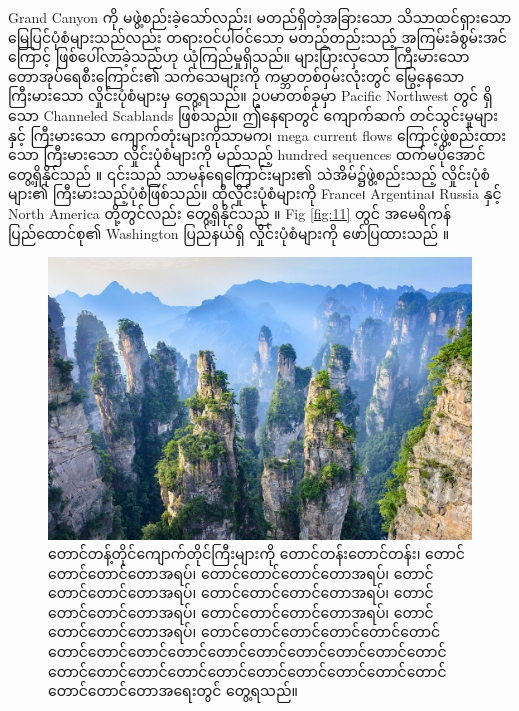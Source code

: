 \documentclass[10pt,twocolumn,letterpaper]{article}
\begin{document}
Grand Canyon ကို မဖွဲ့စည်းခဲ့သော်လည်း၊ မတည်ရှိတဲ့အခြားသော သိသာထင်ရှားသော မြေပြင်ပုံစံများသည်လည်း တရားဝင်ပါဝင်သော မတည့်တည်းသည့် အကြမ်းခံစွမ်းအင်ကြောင့် ဖြစ်ပေါ်လာခဲ့သည်ဟု ယုံကြည်မှုရှိသည်။ များပြားလှသော ကြီးမားသော တောအုပ်ရေစီးကြောင်း၏ သက်သေများကို ကမ္ဘာတစ်ဝှမ်းလုံးတွင် မြွေ့နေသော ကြီးမားသော လှိုင်းပုံစံများမှ တွေ့ရသည်။ ဥပမာတစ်ခုမှာ Pacific Northwest တွင် ရှိသော Channeled Scablands ဖြစ်သည်။ ဤနေရာတွင် ကျောက်ဆက် တင်သွင်းမှုများနှင့် ကြီးမားသော ကျောက်တုံးများကိုသာမက၊ mega current flows ကြောင့်ဖွဲ့စည်းထားသော ကြီးမားသော လှိုင်းပုံစံများကို မည်သည့် hundred sequences ထက်မပိုအောင် တွေ့ရှိနိုင်သည် \cite{78,79} ။ ၎င်းသည် သာမန်ရေကြောင်းများ၏ သဲအိမ်၌ဖွဲ့စည်းသည့် လှိုင်းပုံစံများ၏ ကြီးမားသည့်ပုံစံဖြစ်သည်။ ထိုလှိုင်းပုံစံများကို France၊ Argentina၊ Russia နှင့် North America တို့တွင်လည်း တွေ့ရှိနိုင်သည် \cite{81} ။ Fig \ref{fig:11} တွင် အမေရိကန်ပြည်ထောင်စု၏ Washington ပြည်နယ်ရှိ လှိုင်းပုံစံများကို ဖော်ပြထားသည် \cite{80}။

\begin{figure}[b]
\begin{center}
   \includegraphics[width=1\linewidth]{zhangjiajie.jpg}
\end{center}
   \caption{တောင်တန့်တိုင်ကျောက်တိုင်ကြီးများကို တောင်တန်းတောင်တန်း၊ တောင်တောင်တောင်တောအရပ်၊ တောင်တောင်တောင်တောအရပ်၊ တောင်တောင်တောင်တောအရပ်၊ တောင်တောင်တောင်တောအရပ်၊ တောင်တောင်တောင်တောအရပ်၊ တောင်တောင်တောင်တောအရပ်၊ တောင်တောင်တောင်တောအရပ်၊ တောင်တောင်တောင်တောင်တောင်တောင်တောင်တောင်တောင်တောင်တောင်တောင်တောင်တောင်တောင်တောင်တောင်တောင်တောင်တောင်တောင်တောင်တောင်တောင်တောင်တောင်တောင်တောင်တောအရေးတွင် တွေ့ရသည်။}
\label{fig:12}
\label{fig:onecol}
\end{figure}
\end{document}

